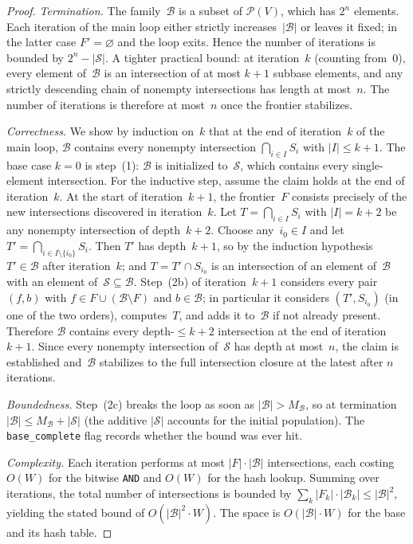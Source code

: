 \documentclass[11pt,a4paper]{article}
\theoremstyle{plain}
\theoremstyle{definition}
\newcommand{\powerset}{\mathcal{P}}
\newcommand{\subbase}{\mathcal{S}}
\newcommand{\base}{\mathcal{B}}
\begin{document}
\begin{proof}
\emph{Termination.}  The family~$\base$ is a subset of $\powerset(V)$, which
has $2^n$ elements.  Each iteration of the main loop either strictly
increases~$|\base|$ or leaves it fixed; in the latter case $F' = \varnothing$
and the loop exits.  Hence the number of iterations is bounded by
$2^n - |\subbase|$.  A tighter practical bound: at iteration~$k$ (counting
from~$0$), every element of~$\base$ is an intersection of at most $k+1$
subbase elements, and any strictly descending chain of nonempty intersections
has length at most~$n$.  The number of iterations is therefore at most~$n$
once the frontier stabilizes.

\emph{Correctness.}  We show by induction on~$k$ that at the end of
iteration~$k$ of the main loop, $\base$ contains every nonempty intersection
$\bigcap_{i \in I} S_i$ with $|I| \leq k+1$.  The base case $k = 0$ is
step~(1): $\base$ is initialized to~$\subbase$, which contains every
single-element intersection.  For the inductive step, assume the claim holds
at the end of iteration~$k$.  At the start of iteration~$k+1$, the
frontier~$F$ consists precisely of the new intersections discovered in
iteration~$k$.  Let $T = \bigcap_{i \in I} S_i$ with $|I| = k+2$ be any
nonempty intersection of depth~$k+2$.  Choose any~$i_0 \in I$ and let
$T' = \bigcap_{i \in I \setminus \{i_0\}} S_i$.  Then $T'$ has depth~$k+1$,
so by the induction hypothesis $T' \in \base$ after iteration~$k$; and
$T = T' \cap S_{i_0}$ is an intersection of an element of~$\base$ with an
element of~$\subbase \subseteq \base$.  Step~(2b) of iteration~$k+1$
considers every pair $(f, b)$ with $f \in F \cup (\base \setminus F)$ and
$b \in \base$; in particular it considers $(T', S_{i_0})$ (in one of the two
orders), computes~$T$, and adds it to~$\base$ if not already present.
Therefore $\base$ contains every depth-$\leq k+2$ intersection at the end of
iteration~$k+1$.  Since every nonempty intersection of~$\subbase$ has depth
at most~$n$, the claim is established and~$\base$ stabilizes to the full
intersection closure at the latest after $n$ iterations.

\emph{Boundedness.}  Step~(2c) breaks the loop as soon as $|\base| >
M_{\base}$, so at termination $|\base| \leq M_{\base} + |\subbase|$ (the
additive $|\subbase|$ accounts for the initial population).  The
\texttt{base\_complete} flag records whether the bound was ever hit.

\emph{Complexity.}  Each iteration performs at most $|F| \cdot |\base|$
intersections, each costing $O(W)$ for the bitwise \texttt{AND} and $O(W)$
for the hash lookup.  Summing over iterations, the total number of
intersections is bounded by $\sum_{k} |F_k| \cdot |\base_k| \leq |\base|^2$,
yielding the stated bound of $O(|\base|^2 \cdot W)$.  The space is
$O(|\base| \cdot W)$ for the base and its hash table.
\end{proof}
\end{document}
